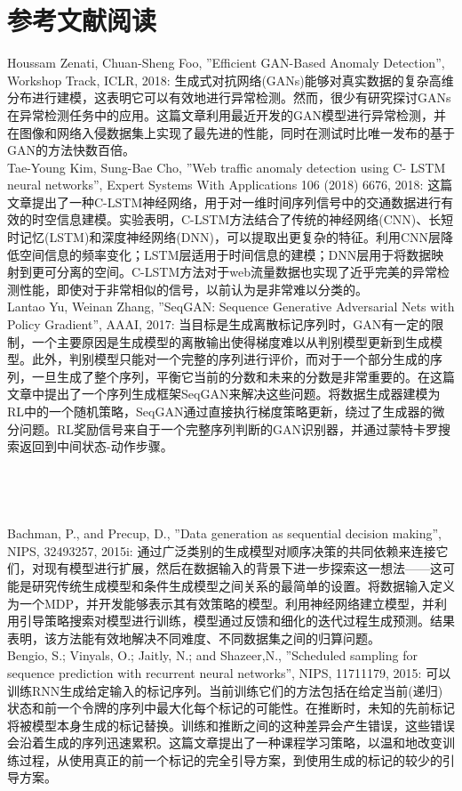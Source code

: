 \documentclass[11pt,a4paper]{ctexart}
\begin{document}
\section{参考文献阅读}
\noindent Houssam Zenati, Chuan-Sheng Foo, ”Efficient GAN-Based Anomaly Detection”, Workshop Track, ICLR, 2018: 生成式对抗网络(GANs)能够对真实数据的复杂高维分布进行建模，这表明它可以有效地进行异常检测。然而，很少有研究探讨GANs在异常检测任务中的应用。这篇文章利用最近开发的GAN模型进行异常检测，并在图像和网络入侵数据集上实现了最先进的性能，同时在测试时比唯一发布的基于GAN的方法快数百倍。\\
Tae-Young Kim, Sung-Bae Cho, ”Web traffic anomaly detection using C- LSTM neural networks”, Expert Systems With Applications 106 (2018) 6676, 2018: 这篇文章提出了一种C-LSTM神经网络，用于对一维时间序列信号中的交通数据进行有效的时空信息建模。实验表明，C-LSTM方法结合了传统的神经网络(CNN)、长短时记忆(LSTM)和深度神经网络(DNN)，可以提取出更复杂的特征。利用CNN层降低空间信息的频率变化；LSTM层适用于时间信息的建模；DNN层用于将数据映射到更可分离的空间。C-LSTM方法对于web流量数据也实现了近乎完美的异常检测性能，即使对于非常相似的信号，以前认为是非常难以分类的。\\
Lantao Yu, Weinan Zhang, ”SeqGAN: Sequence Generative Adversarial Nets with Policy Gradient”, AAAI, 2017: 当目标是生成离散标记序列时，GAN有一定的限制，一个主要原因是生成模型的离散输出使得梯度难以从判别模型更新到生成模型。此外，判别模型只能对一个完整的序列进行评价，而对于一个部分生成的序列，一旦生成了整个序列，平衡它当前的分数和未来的分数是非常重要的。在这篇文章中提出了一个序列生成框架SeqGAN来解决这些问题。将数据生成器建模为RL中的一个随机策略，SeqGAN通过直接执行梯度策略更新，绕过了生成器的微分问题。RL奖励信号来自于一个完整序列判断的GAN识别器，并通过蒙特卡罗搜索返回到中间状态-动作步骤。\\\\\\\\\\
Bachman, P., and Precup, D., ”Data generation as sequential decision making”, NIPS, 32493257, 2015i: 通过广泛类别的生成模型对顺序决策的共同依赖来连接它们，对现有模型进行扩展，然后在数据输入的背景下进一步探索这一想法——这可能是研究传统生成模型和条件生成模型之间关系的最简单的设置。将数据输入定义为一个MDP，并开发能够表示其有效策略的模型。利用神经网络建立模型，并利用引导策略搜索对模型进行训练，模型通过反馈和细化的迭代过程生成预测。结果表明，该方法能有效地解决不同难度、不同数据集之间的归算问题。\\
Bengio, S.; Vinyals, O.; Jaitly, N.; and Shazeer,N., ”Scheduled sampling for sequence prediction with recurrent neural networks”, NIPS, 11711179, 2015: 可以训练RNN生成给定输入的标记序列。当前训练它们的方法包括在给定当前(递归)状态和前一个令牌的序列中最大化每个标记的可能性。在推断时，未知的先前标记将被模型本身生成的标记替换。训练和推断之间的这种差异会产生错误，这些错误会沿着生成的序列迅速累积。这篇文章提出了一种课程学习策略，以温和地改变训练过程，从使用真正的前一个标记的完全引导方案，到使用生成的标记的较少的引导方案。	\\
\end{document}
